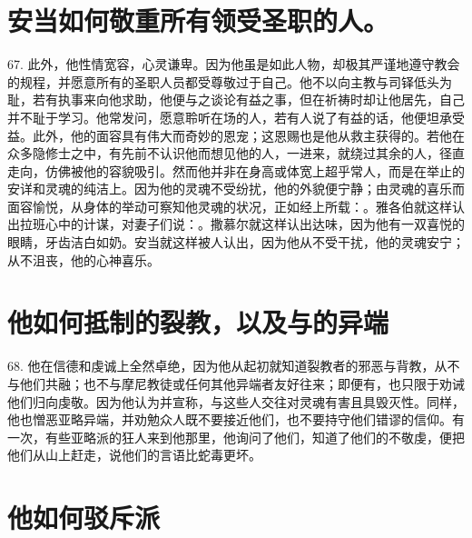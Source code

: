 
\section{安当如何敬重所有领受圣职的人。}

67. 此外，他性情宽容，心灵谦卑。因为他虽是如此人物，却极其严谨地遵守教会的规程，并愿意所有的圣职人员都受尊敬过于自己。他不以向主教与司铎低头为耻，若有执事来向他求助，他便与之谈论有益之事，但在祈祷时却让他居先，自己并不耻于学习。他常发问，愿意聆听在场的人，若有人说了有益的话，他便坦承受益。此外，他的面容具有伟大而奇妙的恩宠；这恩赐也是他从救主获得的。若他在众多隐修士之中，有先前不认识他而想见他的人，一进来，就绕过其余的人，径直走向，仿佛被他的容貌吸引。然而他并非在身高或体宽上超乎常人，而是在举止的安详和灵魂的纯洁上。因为他的灵魂不受纷扰，他的外貌便宁静；由灵魂的喜乐而面容愉悦，从身体的举动可察知他灵魂的状况，正如经上所载：。雅各伯就这样认出拉班心中的计谋，对妻子们说：。撒慕尔就这样认出达味，因为他有一双喜悦的眼睛，牙齿洁白如奶。安当就这样被人认出，因为他从不受干扰，他的灵魂安宁；从不沮丧，他的心神喜乐。\par


\section{他如何抵制的裂教，以及与的异端}

68. 他在信德和虔诚上全然卓绝，因为他从起初就知道裂教者的邪恶与背教，从不与他们共融；也不与摩尼教徒或任何其他异端者友好往来；即便有，也只限于劝诫他们归向虔敬。因为他认为并宣称，与这些人交往对灵魂有害且具毁灭性。同样，他也憎恶亚略异端，并劝勉众人既不要接近他们，也不要持守他们错谬的信仰。有一次，有些亚略派的狂人来到他那里，他询问了他们，知道了他们的不敬虔，便把他们从山上赶走，说他们的言语比蛇毒更坏。\par


\section{他如何驳斥派}

